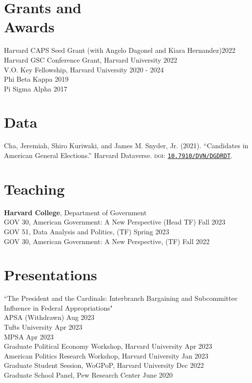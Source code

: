 \documentclass[margin, line]{res}
\begin{document}
\begin{resume}
\section{Grants and \\Awards}
Harvard CAPS Seed Grant (with Angelo Dagonel and Kiara Hernandez)\hfill 2022\\
Harvard GSC Conference Grant, Harvard University \hfill 2022\\
V.O. Key Fellowship, Harvard University \hfill 2020 - 2024\\
Phi Beta Kappa \hfill 2019\\
Pi Sigma Alpha \hfill 2017

\section{Data}
\begin{etaremune}
	\item Cha, Jeremiah, Shiro Kuriwaki, and James M. Snyder, Jr. (2021). ``Candidates in American General Elections.'' Harvard Dataverse. \textsc{doi}: \href{https://doi.org/10.7910/DVN/DGDRDT}{\texttt{10.7910/DVN/DGDRDT}}.
\end{etaremune}

\section{Teaching}
\textbf{Harvard College}, Department of Government\\
\hspace*{5mm} GOV 30, American Government: A New Perspective (Head TF) \hfill Fall 2023\\
\hspace*{5mm} GOV 51, Data Analysis and Politics, (TF) \hfill Spring 2023\\
\hspace*{5mm} GOV 30, American Government: A New Perspective,  (TF) \hfill Fall 2022

\section{Presentations}
``The President and the Cardinals: Interbranch Bargaining and Subcommittee Influence in Federal Appropriations"\\
\hspace*{5mm} APSA (Withdrawn) \hfill Aug 2023\\
\hspace*{5mm} Tufts University \hfill Apr 2023\\
\hspace*{5mm} MPSA \hfill Apr 2023\\
\hspace*{5mm} Graduate Political Economy Workshop, Harvard University \hfill Apr 2023\\
\hspace*{5mm} American Politics Research Workshop, Harvard University \hfill Jan 2023\\
\hspace*{5mm} Graduate Student Session, WoGPoP, Harvard University \hfill Dec 2022\\
Graduate School Panel, Pew Research Center  \hfill June 2020


\end{resume}
\end{document}
